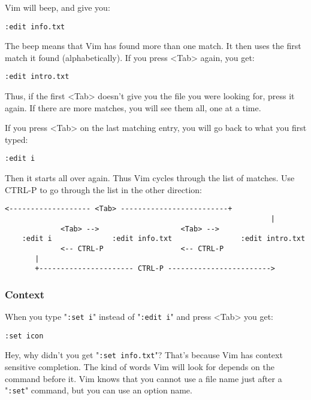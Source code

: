 Vim will beep, and give you:

\begin{Verbatim}[samepage=true]
 :edit info.txt
\end{Verbatim}

The beep means that Vim has found more than one match.
It then uses the first match it found (alphabetically).
If you press <Tab> again, you get:

\begin{Verbatim}[samepage=true]
 :edit intro.txt
\end{Verbatim}

Thus, if the first <Tab> doesn't give you the file you were looking for, press it again.
If there are more matches, you will see them all, one at a time.

If you press <Tab> on the last matching entry, you will go back to what you first typed:

\begin{Verbatim}[samepage=true]
 :edit i
\end{Verbatim}

Then it starts all over again.
Thus Vim cycles through the list of matches.
Use CTRL-P to go through the list in the other direction:

\begin{Verbatim}[samepage=true]
          <------------------- <Tab> -------------------------+
                                                              |
             <Tab> -->                   <Tab> -->
    :edit i              :edit info.txt                :edit intro.txt
             <-- CTRL-P                  <-- CTRL-P
       |
       +---------------------- CTRL-P ------------------------>
\end{Verbatim}
\subsubsection{Context}
When you type "\verb!:set i!" instead of "\verb!:edit i!" and press <Tab> you get:

\begin{Verbatim}[samepage=true]
 :set icon
\end{Verbatim}

Hey, why didn't you get "\verb!:set info.txt!"?
That's because Vim has context sensitive completion.
The kind of words Vim will look for depends on the command before it.
Vim knows that you cannot use a file name just after a "\verb!:set!" command, but you can use an option name.

